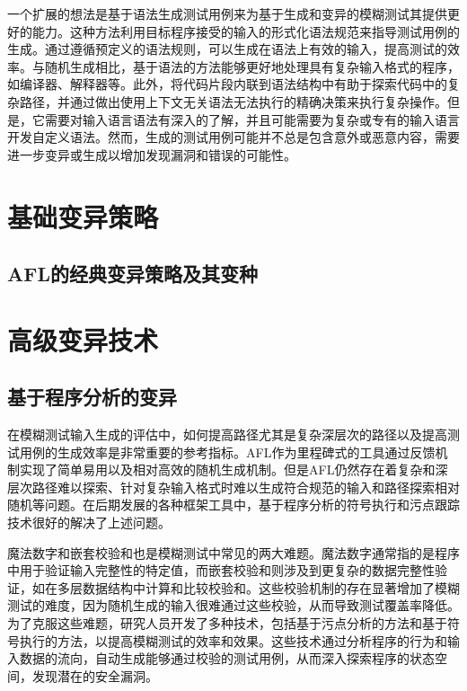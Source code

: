 \documentclass[10.5pt,compsoc]{CjC}
\theoremstyle{mystyle}
\begin{document}
一个扩展的想法是基于语法生成测试用例\cite{Cornelius, Martin}来为基于生成和变异的模糊测试其提供更好的能力。这种方法利用目标程序接受的输入的形式化语法规范来指导测试用例的生成。通过遵循预定义的语法规则，可以生成在语法上有效的输入，提高测试的效率。与随机生成相比，基于语法的方法能够更好地处理具有复杂输入格式的程序，如编译器、解释器等。此外，将代码片段内联到语法结构中有助于探索代码中的复杂路径，并通过做出使用上下文无关语法无法执行的精确决策来执行复杂操作。但是，它需要对输入语言语法有深入的了解，并且可能需要为复杂或专有的输入语言开发自定义语法。然而，生成的测试用例可能并不总是包含意外或恶意内容，需要进一步变异或生成以增加发现漏洞和错误的可能性。
\vspace {10mm}

\section{基础变异策略}

\subsection{AFL的经典变异策略及其变种}



\section{高级变异技术}

\subsection{基于程序分析的变异}
在模糊测试输入生成的评估中，如何提高路径尤其是复杂深层次的路径以及提高测试用例的生成效率是非常重要的参考指标。AFL作为里程碑式的工具通过反馈机制实现了简单易用以及相对高效的随机生成机制。但是AFL仍然存在着复杂和深层次路径难以探索、针对复杂输入格式时难以生成符合规范的输入和路径探索相对随机等问题。在后期发展的各种框架工具中，基于程序分析的符号执行和污点跟踪技术很好的解决了上述问题。

魔法数字和嵌套校验和也是模糊测试中常见的两大难题。魔法数字通常指的是程序中用于验证输入完整性的特定值，而嵌套校验和则涉及到更复杂的数据完整性验证，如在多层数据结构中计算和比较校验和。这些校验机制的存在显著增加了模糊测试的难度，因为随机生成的输入很难通过这些校验，从而导致测试覆盖率降低。为了克服这些难题，研究人员开发了多种技术，包括基于污点分析的方法和基于符号执行的方法，以提高模糊测试的效率和效果。这些技术通过分析程序的行为和输入数据的流向，自动生成能够通过校验的测试用例，从而深入探索程序的状态空间，发现潜在的安全漏洞。
\end{document}
